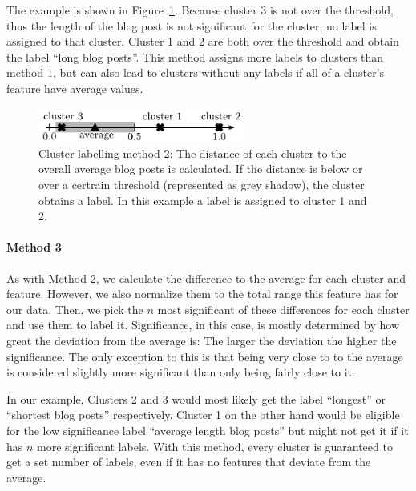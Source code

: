 The example is shown in Figure~\ref{fig:cluster_labeling_2}.
Because cluster 3 is not over the threshold, thus the length of the blog post is not significant for the cluster, no label is assigned to that cluster.
Cluster 1 and 2 are both over the threshold and obtain the label ``long blog posts''.
This method assigns more labels to clusters than method 1, but can also lead to clusters without any labels if all of a cluster's feature have average values.

\begin{figure}[ht]
	\centering
	\includegraphics[width=0.6\textwidth]{images/cluster_labeling_2.pdf}
	\caption{Cluster labelling method 2: The distance of each cluster to the overall average blog posts is calculated. If the distance is below or over a certrain threshold (represented as grey shadow), the cluster obtains a label. In this example a label is assigned to cluster 1 and 2.}
	\label{fig:cluster_labeling_2}
\end{figure}

\paragraph{Method 3}
As with Method 2, we calculate the difference to the average for each cluster and feature.
However, we also normalize them to the total range this feature has for our data.
Then, we pick the $n$ most significant of these differences for each cluster and use them to label it.
Significance, in this case, is mostly determined by how great the deviation from the average is: The larger the deviation the higher the significance.
The only exception to this is that being very close to to the average is considered slightly more significant than only being fairly close to it.

In our example, Clusters 2 and 3 would most likely get the label ``longest'' or ``shortest blog posts'' respectively.
Cluster 1 on the other hand would be eligible for the low significance label ``average length blog posts'' but might not get it if it has $n$ more significant labels.
With this method, every cluster is guaranteed to get a set number of labels, even if it has no features that deviate from the average.
